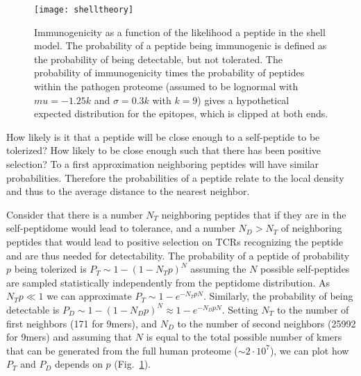 \documentclass[superscriptaddress,twocolumn,pre]{revtex4}
\newcommand{\<}{\langle}
\renewcommand{\>}{\rangle}
\begin{document}
\begin{figure}
    \texttt{[image: shelltheory]}
    \caption{Immunogenicity as a function of the likelihood a peptide in the shell model. The probability of a peptide being immunogenic is defined as the probability of being detectable, but not tolerated. The probability of immunogenicity times the probability of peptides within the pathogen proteome (assumed to be lognormal with $mu = -1.25 k$ and $\sigma = 0.3 k$ with $k=9$) gives a hypothetical expected distribution for the epitopes, which is clipped at both ends.  
    \label{figshelltheory}
    }
\end{figure}

How likely is it that a peptide will be close enough to a self-peptide to be tolerized? How likely to be close enough such that there has been positive selection? To a first approximation neighboring peptides will have similar probabilities. Therefore the probabilities of a peptide relate to the local density and thus to the average distance to the nearest neighbor.

Consider that there is a number $N_T$ neighboring peptides that if they are in the self-peptidome would lead to tolerance, and a number $N_D > N_T$ of neighboring peptides that would lead to positive selection on TCRs recognizing the peptide and are thus needed for detectability. The probability of a peptide of probability $p$ being tolerized is $P_T \sim 1-(1-N_T p)^N$ assuming the $N$ possible self-peptides are sampled statistically independently from the peptidome distribution. As $N_T p \ll 1$ we can approximate $P_T \sim 1-e^{-N_T p N}$. Similarly, the probability of being detectable is $P_D \sim 1-(1-N_D p)^N \approx 1-e^{-N_D p N}$. Setting $N_T$ to the number of first neighbors (171 for 9mers), and $N_D$ to the number of second neighbors (25992 for 9mers) and assuming that $N$ is equal to the total possible number of kmers that can be generated from the full human proteome ($\sim 2 \cdot 10^7$), we can plot how $P_T$ and $P_D$ depends on $p$ (Fig.~\ref{figshelltheory}).
\end{document}
